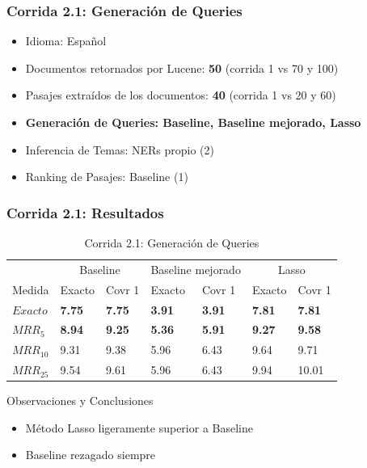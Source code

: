 

\begin{frame}
\frametitle{Corrida 2.1: Generación de Queries}

\begin{itemize}
  \item Idioma: Español
  \item Documentos retornados por Lucene: \textbf{50} (corrida 1 vs 70 y 100)
  \item Pasajes extraídos de los documentos: \textbf{40} (corrida 1 vs 20 y 60)
  \item \textbf{{\color{blue}Generación de Queries: Baseline, Baseline mejorado, Lasso}}
  \item Inferencia de Temas: NERs propio (2)
  \item Ranking de Pasajes: Baseline (1)
\end{itemize}

\end{frame}

\begin{frame}
\frametitle{Corrida 2.1: Resultados}


\begin{table}
\centering
\begin{center}
\begin{tabular}{|l | l | l | l | l | l | l |}

& \multicolumn{2}{|c|}{Baseline} & \multicolumn{2}{|c|}{Baseline mejorado} & \multicolumn{2}{|c|}{Lasso}\\ 
Medida & Exacto & Covr 1 & Exacto & Covr 1 & Exacto & Covr 1 \\ 

\textbf{$Exacto$} & \textbf{7.75} & \textbf{7.75} &  \textbf{3.91} & \textbf{3.91} & \textbf{{\color{green}7.81}} & \textbf{{\color{green}7.81}} \\ 
$MRR_{5}$ & \textbf{8.94} & \textbf{9.25} &  \textbf{5.36} & \textbf{5.91} & \textbf{9.27} & \textbf{9.58}   \\ 
$MRR_{10}$ & 9.31 & 9.38 &  5.96 & 6.43 & 9.64 & 9.71   \\ 
$MRR_{25}$ & 9.54 & 9.61 &  5.96 & 6.43 & 9.94 & 10.01  \\ 
\end{tabular}

\caption{Corrida 2.1: Generación de Queries}
\end{center}
\end{table}

Observaciones y Conclusiones
\begin{itemize}
  \item Método Lasso ligeramente superior a Baseline
  \item Baseline  rezagado siempre
\end{itemize}

\end{frame}


